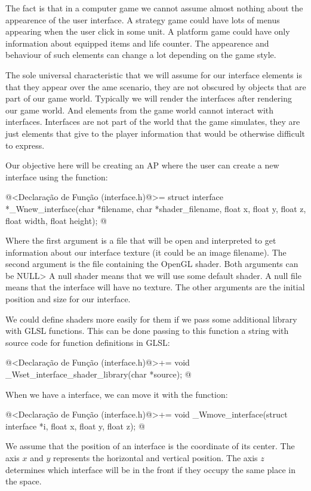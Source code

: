 The fact is that in a computer game we cannot assume almost nothing
about the appearence of the user interface. A strategy game could have
lots of menus appearing when the user click in some unit. A platform
game could have only information about equipped items and life
counter. The appearence and behaviour of such elements can change a
lot depending on the game style.

The sole universal characteristic that we will assume for our
interface elements is that they appear over the ame scenario, they are
not obscured by objects that are part of our game world. Typically we
will render the interfaces after rendering our game world. And
elements from the game world cannot interact with
interfaces. Interfaces are not part of the world that the game
simulates, they are just elements that give to the player information
that would be otherwise difficult to express.

Our objective here will be creating an AP where the user can create a
new interface using the function:

\iniciocodigo
@<Declaração de Função (interface.h)@>=
struct interface *_Wnew_interface(char *filename, char *shader_filename,
                                  float x, float y, float z, float width,
                                  float height);
@
\fimcodigo

Where the first argument is a file that will be open and interpreted
to get information about our interface texture (it could be an image
filename). The second argument is the file containing the OpenGL
shader. Both arguments can be NULL> A null shader means that we will
use some default shader. A null file means that the interface will
have no texture. The other arguments are the initial position and size
for our interface.

We could define shaders more easily for them if we pass some
additional library with GLSL functions. This can be done passing to
this function a string with source code for function definitions in
GLSL:

\iniciocodigo
@<Declaração de Função (interface.h)@>+=
void _Wset_interface_shader_library(char *source);
@
\fimcodigo


When we have a interface, we can move it with the function:

\iniciocodigo
@<Declaração de Função (interface.h)@>+=
void _Wmove_interface(struct interface *i, float x, float y, float z);
@
\fimcodigo

We assume that the position of an interface is the coordinate of its
center. The axis $x$ and $y$ represents the horizontal and vertical
position. The axis $z$ determines which interface will be in the front
if they occupy the same place in the space.

